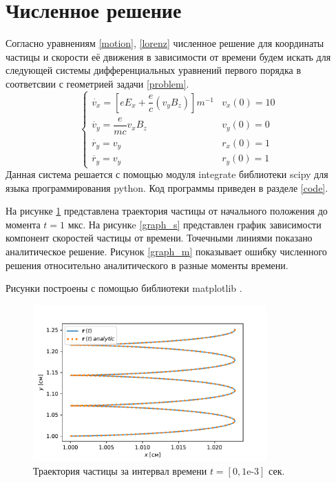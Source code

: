 \documentclass[a4paper]{article}
\begin{document}
\section{Численное решение}
Согласно уравнениям \eqref{motion}, \eqref{lorenz} численное решение для координаты частицы и скорости её движения в зависимости от времени будем искать для следующей системы дифференциальных уравнений первого порядка в соответсвии с геометрией задачи \ref{problem}.
\begin{equation}
	\begin{cases}
		\dot{v_x} = \left[eE_x + \dfrac{e}{c}\left(v_yB_z\right)\right]m^{-1}	
											& 	v_x(0) = 10 \\[10pt]
		\dot{v_y} = \dfrac{e}{mc} v_x B_z	&	v_y(0) = 0 \\[10pt]
		\dot{r_y} = v_y						&	r_x(0) = 1 \\[10pt]
		\dot{r_y} = v_y						&	r_y(0) = 1 
	\end{cases}
\end{equation}
Данная система решается с помощью модуля integrate \cite{web:scipy.integrate} библиотеки scipy  для языка программирования python. Код программы приведен в разделе \ref{code}. 

На рисунке \ref{graph_t} представлена траектория частицы от начального положения до момента $t = 1$ мкс. На рисункe \ref{graph_s} представлен график зависимости компонент скоростей частицы от времени. Точечными линиями показано аналитическое решение.  Рисунок \ref{graph_m} показывает ошибку численного решения относительно аналитического в разные моменты времени.

Рисунки построены с помощью библиотеки matplotlib \cite{web:matplotlib}.
\begin{figure}
	\centering
	\includegraphics[width=0.8\textwidth]{plotTrajectory.pdf}
	\caption{Траектория частицы за интервал времени $t = [0, 1\text{e-}3]$ сек.}
	\label{graph_t}
\end{figure}
\end{document}

